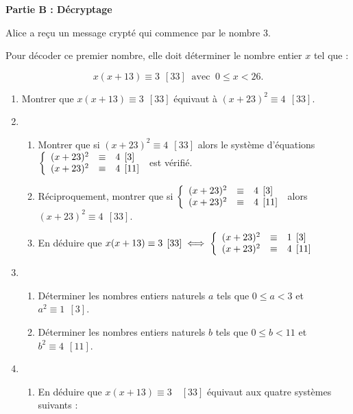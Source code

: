 \documentclass{cornouaille}
\begin{document}
\begin{exercice}[Spécialité][5]
\bigskip

\textbf{Partie B : Décryptage}

\medskip

Alice a reçu un message crypté qui commence par le nombre 3.

Pour décoder ce premier nombre, elle doit déterminer le nombre entier $x$ tel que :

\[x(x + 13) \equiv  3 \:\: [33]\:  \text{ avec }\: 0 \leqslant  x < 26.\]

\medskip

\begin{enumerate}
\item Montrer que $x(x + 13) \equiv 3\:\: [33]$ équivaut à $(x + 23)^2 \equiv 4\:\: [33]$.
\item
	\begin{enumerate}
		\item Montrer que si $(x + 23)^2 \equiv 4\:\: [33]$ alors le système d'équations $\left\{\begin{array}{l c l}
(x + 23)^2 &\equiv &4 \:\: [3]\\ 
(x + 23)^2 &\equiv &4 \:\: [11]
\end{array}\right.$ est vérifié.
		\item Réciproquement, montrer que si  $\left\{\begin{array}{l c l}
(x + 23)^2 &\equiv &4\:\: [3]\\ 
(x + 23)^2 &\equiv &4 \:\: [11]
\end{array}\right.$ alors $(x + 23)^2 \equiv 4\:\: [33]$.
		\item En déduire que $x(x + 13) \equiv 3\:\: [33] \iff  \left\{\begin{array}{l c l}
(x + 23)^2 &\equiv&1 \:\: [3]\\
(x + 23)^2 &\equiv& 4 \:\: [11]
\end{array}\right.$
	\end{enumerate}
\item
	\begin{enumerate}
		\item Déterminer les nombres entiers naturels $a$ tels que $0 \leqslant a < 3$ et $a^2 \equiv 1 \:\:  [3]$.
		\item Déterminer les nombres entiers naturels $b$ tels que $0 \leqslant b < 11$ et $b^2 \equiv 4\:\: [11]$.
 	\end{enumerate}
\item
	\begin{enumerate}
		\item En déduire que $x(x + 13) \equiv 3 \quad[33]$ équivaut aux quatre systèmes suivants :
		

\end{enumerate}
\end{enumerate}
\end{exercice}
\end{document}
